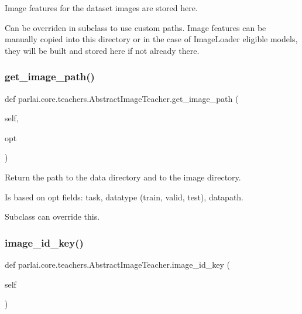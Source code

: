 \begin{DoxyVerb}Image features for the dataset images are stored here.

Can be overriden in subclass to use custom paths. Image features can be manually
copied into this directory or in the case of ImageLoader eligible models, they
will be built and stored here if not already there.
\end{DoxyVerb}
 \mbox{\label{classparlai_1_1core_1_1teachers_1_1AbstractImageTeacher_a22a280003b7f4202e0d917040bd56eb8}} 
\subsubsection{\texorpdfstring{get\+\_\+image\+\_\+path()}{get\_image\_path()}}
{\footnotesize\ttfamily def parlai.\+core.\+teachers.\+Abstract\+Image\+Teacher.\+get\+\_\+image\+\_\+path (\begin{DoxyParamCaption}\item[{}]{self,  }\item[{}]{opt }\end{DoxyParamCaption})}

\begin{DoxyVerb}Return the path to the data directory and to the image directory.

Is based on opt fields: task, datatype (train, valid, test), datapath.

Subclass can override this.
\end{DoxyVerb}
 \mbox{\label{classparlai_1_1core_1_1teachers_1_1AbstractImageTeacher_ada83f1832b7c75f9daab8e4d196ba893}} 
\subsubsection{\texorpdfstring{image\+\_\+id\+\_\+key()}{image\_id\_key()}}
{\footnotesize\ttfamily def parlai.\+core.\+teachers.\+Abstract\+Image\+Teacher.\+image\+\_\+id\+\_\+key (\begin{DoxyParamCaption}\item[{}]{self }\end{DoxyParamCaption})}

